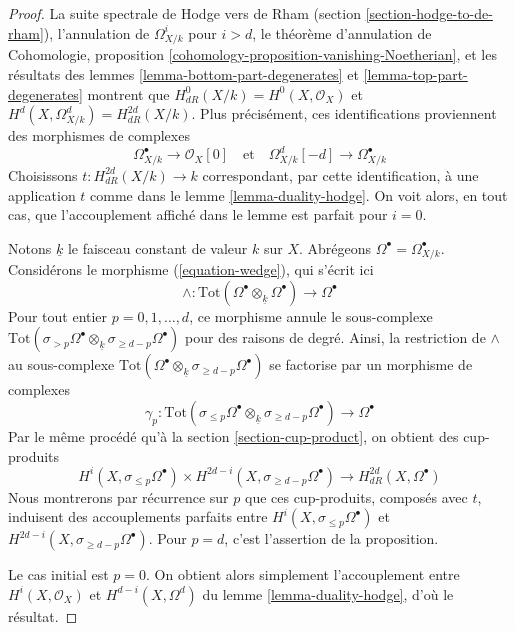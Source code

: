 \begin{proof}
La suite spectrale de Hodge vers de Rham
(section \ref{section-hodge-to-de-rham}), l'annulation
de $\Omega^i_{X/k}$ pour $i > d$, le théorème d'annulation de
Cohomologie, proposition \ref{cohomology-proposition-vanishing-Noetherian},
et les résultats des lemmes \ref{lemma-bottom-part-degenerates} et
\ref{lemma-top-part-degenerates}
montrent que $H^0_{dR}(X/k) = H^0(X, \mathcal{O}_X)$
et $H^d(X, \Omega^d_{X/k}) = H_{dR}^{2d}(X/k)$.
Plus précisément, ces identifications proviennent des morphismes
de complexes
$$
\Omega^\bullet_{X/k} \to \mathcal{O}_X[0]
\quad\text{et}\quad
\Omega^d_{X/k}[-d] \to \Omega^\bullet_{X/k}
$$
Choisissons $t : H_{dR}^{2d}(X/k) \to k$ correspondant, par cette identification,
à une application $t$ comme dans le lemme \ref{lemma-duality-hodge}.
On voit alors, en tout cas, que l'accouplement affiché dans le lemme
est parfait pour $i = 0$.

\medskip\noindent
Notons $\underline{k}$ le faisceau constant de valeur $k$ sur $X$.
Abrégeons $\Omega^\bullet = \Omega^\bullet_{X/k}$.
Considérons le morphisme (\ref{equation-wedge}), qui s'écrit ici
$$
\wedge :
\text{Tot}(\Omega^\bullet \otimes_{\underline{k}} \Omega^\bullet)
\longrightarrow
\Omega^\bullet
$$
Pour tout entier $p = 0, 1, \ldots, d$, ce morphisme
annule le sous-complexe
$\text{Tot}(\sigma_{> p} \Omega^\bullet \otimes_{\underline{k}}
\sigma_{\geq d - p} \Omega^\bullet)$ pour des raisons de degré.
Ainsi, la restriction de $\wedge$ au sous-complexe
$\text{Tot}(\Omega^\bullet \otimes_{\underline{k}}
\sigma_{\geq d - p}\Omega^\bullet)$ se factorise par un morphisme de complexes
$$
\gamma_p :
\text{Tot}(\sigma_{\leq p} \Omega^\bullet \otimes_{\underline{k}}
\sigma_{\geq d - p} \Omega^\bullet)
\longrightarrow
\Omega^\bullet
$$
Par le même procédé qu'à la section \ref{section-cup-product}, on obtient des
cup-produits
$$
H^i(X, \sigma_{\leq p} \Omega^\bullet) \times
H^{2d - i}(X, \sigma_{\geq d - p}\Omega^\bullet)
\longrightarrow
H_{dR}^{2d}(X, \Omega^\bullet)
$$
Nous montrerons par récurrence sur $p$ que ces cup-produits, composés avec $t$,
induisent des accouplements parfaits entre $H^i(X, \sigma_{\leq p} \Omega^\bullet)$
et $H^{2d - i}(X, \sigma_{\geq d - p}\Omega^\bullet)$. Pour $p = d$,
c'est l'assertion de la proposition.

\medskip\noindent
Le cas initial est $p = 0$. On obtient alors simplement l'accouplement
entre $H^i(X, \mathcal{O}_X)$ et $H^{d - i}(X, \Omega^d)$ du
lemme \ref{lemma-duality-hodge}, d'où le résultat.


\end{proof}
